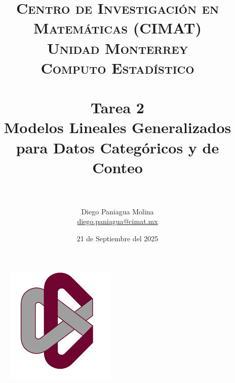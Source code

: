\documentclass[paper=letter, fontsize=11pt]{article}
\title{	
\normalfont \normalsize 
\textsc{Centro de Investigaci\'on en Matem\'aticas (CIMAT)\\
Unidad Monterrey
\\ [15pt]
\textcolor{CIMATRed}{\textbf{\large{Computo Estadístico}}}} 
\\ [25pt] 
\horrule{0.5pt} \\[0.4cm] %
\huge \textbf{Tarea 2} \\[0.2cm]
\large{Modelos Lineales Generalizados para Datos Categóricos y de Conteo}\\ 
\horrule{2pt} \\[0.5cm] %
}
\author{\normalsize{Diego Paniagua Molina}\\\normalsize{\href{mailto:diego.paniagua@cimat.mx} {diego.paniagua@cimat.mx}}}
\date{\normalsize{21 de Septiembre del 2025}} %
\numberwithin{equation}{section} %
\numberwithin{figure}{section} %
\numberwithin{table}{section} %
\begin{document}
\maketitle %
\thispagestyle{empty}

\begin{figure}[htpb]
  \begin{center}
    \includegraphics[scale=0.6]{images/CIMAT_logo.png}
    \label{fig:hist1}
  \end{center}
\end{figure}

\newpage
{} %

\end{document}
